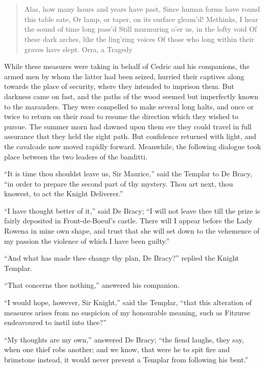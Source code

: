 \chapter{}

\begin{quote}
Alas, how many hours and years have past,
Since human forms have round this table sate,
Or lamp, or taper, on its surface gleam'd!
Methinks, I hear the sound of time long pass'd
Still murmuring o'er us, in the lofty void
Of these dark arches, like the ling'ring voices
Of those who long within their graves have slept.
Orra, a Tragedy
\end{quote}

While these measures were taking in behalf of Cedric and his companions,
the armed men by whom the latter had been seized, hurried their captives
along towards the place of security, where they intended to imprison
them. But darkness came on fast, and the paths of the wood seemed but
imperfectly known to the marauders. They were compelled to make several
long halts, and once or twice to return on their road to resume the
direction which they wished to pursue. The summer morn had dawned upon
them ere they could travel in full assurance that they held the right
path. But confidence returned with light, and the cavalcade now moved
rapidly forward. Meanwhile, the following dialogue took place between
the two leaders of the banditti.

``It is time thou shouldst leave us, Sir Maurice,'' said the Templar to
De Bracy, ``in order to prepare the second part of thy mystery. Thou art
next, thou knowest, to act the Knight Deliverer.''

``I have thought better of it,'' said De Bracy; ``I will not leave thee
till the prize is fairly deposited in Front-de-Boeuf's castle. There
will I appear before the Lady Rowena in mine own shape, and trust that
she will set down to the vehemence of my passion the violence of which I
have been guilty.''

``And what has made thee change thy plan, De Bracy?'' replied the Knight
Templar.

``That concerns thee nothing,'' answered his companion.

``I would hope, however, Sir Knight,'' said the Templar, ``that this
alteration of measures arises from no suspicion of my honourable
meaning, such as Fitzurse endeavoured to instil into thee?''

``My thoughts are my own,'' answered De Bracy; ``the fiend laughs, they
say, when one thief robs another; and we know, that were he to spit fire
and brimstone instead, it would never prevent a Templar from following
his bent.''

